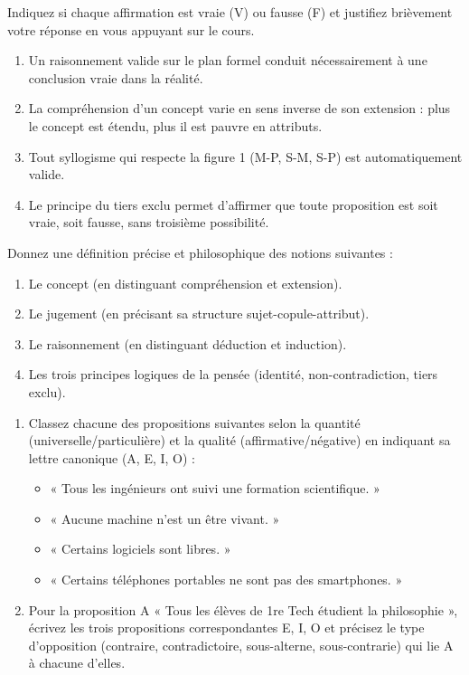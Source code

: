 \documentclass[11pt]{article}
\newcommand{\cle}[1]{{\popxbold\color{popdark}#1}}
\begin{document}
\begin{exercice}
Indiquez si chaque affirmation est vraie (V) ou fausse (F) et justifiez brièvement votre réponse en vous appuyant sur le cours.
\begin{enumerate}
    \item Un raisonnement valide sur le plan formel conduit nécessairement à une conclusion vraie dans la réalité.
    \item La compréhension d'un concept varie en sens inverse de son extension : plus le concept est étendu, plus il est pauvre en attributs.
    \item Tout syllogisme qui respecte la figure 1 (M-P, S-M, S-P) est automatiquement valide.
    \item Le principe du tiers exclu permet d'affirmer que toute proposition est soit vraie, soit fausse, sans troisième possibilité.
\end{enumerate}
\end{exercice}

\begin{exercice}
Donnez une définition précise et philosophique des notions suivantes :
\begin{enumerate}
    \item Le \cle{concept} (en distinguant compréhension et extension).
    \item Le \cle{jugement} (en précisant sa structure sujet-copule-attribut).
    \item Le \cle{raisonnement} (en distinguant déduction et induction).
    \item Les trois \cle{principes logiques de la pensée} (identité, non-contradiction, tiers exclu).
\end{enumerate}
\end{exercice}

\begin{exercice}
\begin{enumerate}
    \item Classez chacune des propositions suivantes selon la quantité (universelle/particulière) et la qualité (affirmative/négative) en indiquant sa lettre canonique (A, E, I, O) :
    \begin{itemize}
        \item « Tous les ingénieurs ont suivi une formation scientifique. »
        \item « Aucune machine n'est un être vivant. »
        \item « Certains logiciels sont libres. »
        \item « Certains téléphones portables ne sont pas des smartphones. »
    \end{itemize}
    \item Pour la proposition A « Tous les élèves de 1re Tech étudient la philosophie », écrivez les trois propositions correspondantes E, I, O et précisez le type d'opposition (contraire, contradictoire, sous-alterne, sous-contrarie) qui lie A à chacune d'elles.
\end{enumerate}
\end{exercice}
\end{document}
